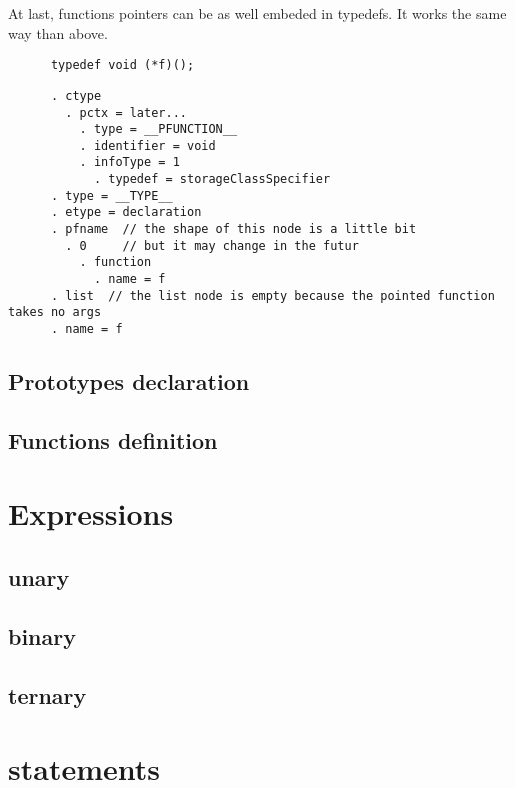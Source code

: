 \documentclass[a4paper,11pt]{report}
\begin{document}
    At last, functions pointers can be as well embeded in typedefs.
    It works the same way than above.
    
    \begin{lstlisting}
      typedef void (*f)();
    \end{lstlisting}
    \begin{lstlisting}
      . ctype
        . pctx = later...
          . type = __PFUNCTION__
          . identifier = void
          . infoType = 1
            . typedef = storageClassSpecifier
      . type = __TYPE__
      . etype = declaration
      . pfname  // the shape of this node is a little bit
        . 0     // but it may change in the futur
          . function
            . name = f
      . list  // the list node is empty because the pointed function takes no args
      . name = f
    \end{lstlisting}
    

  \section{Prototypes declaration}


  \section{Functions definition}


  \chapter{Expressions}


    \section{unary}


    \section{binary}


    \section{ternary}

  \chapter{statements}
\end{document}
